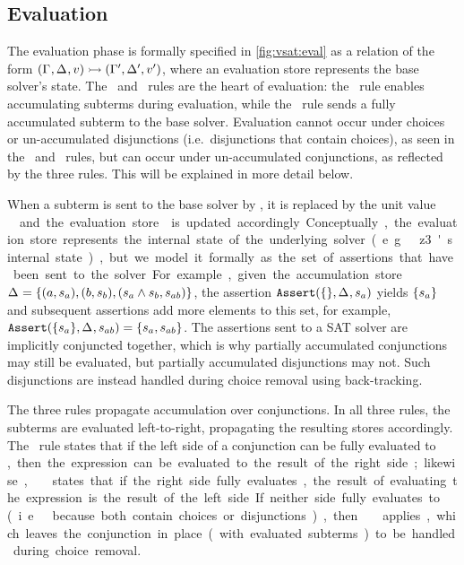 \subsection{Evaluation}
%
The evaluation phase is formally specified in \autoref{fig:vsat:eval} as a
relation of the form
$(\Gamma_{},\Delta_{},v)\rightarrowtail{}(\Gamma_{}',\Delta_{}',v')$, where an
evaluation store \eStore{} represents the base solver's state.
%
The \evAcc\ and \evSym\ rules are the heart of evaluation: the \evAcc\ rule
enables accumulating subterms during evaluation, while the \evSym\ rule sends a
fully accumulated subterm to the base solver. Evaluation cannot occur under
choices or un-accumulated disjunctions (i.e.\ disjunctions that contain
choices), as seen in the \evChc\ and \evOr\ rules, but can occur under
un-accumulated conjunctions, as reflected by the three  rules. This
will be explained in more detail below.


When a subterm is sent to the base solver by \evSym, it is replaced by the unit
value \unit\ and the evaluation store \eStore{} is updated accordingly.
%
Conceptually, the evaluation store represents the internal state of the
underlying solver (e.g.\ z3's internal state), but we model it formally as the
set of assertions that have been sent to the solver. For example, given the
accumulation store $\aStore{}=\set{(a,s_a),(b,s_b),(s_a \wedge s_b, s_{ab})}$,
the assertion $\passert(\set{},\aStore{},s_{a})$ yields $\set{s_a}$ and
subsequent assertions add more elements to this set, for example,
$\passert(\set{s_a},\aStore{},s_{ab})=\set{s_a,s_{ab}}$.
%
The assertions sent to a SAT solver are implicitly conjuncted together, which
is why partially accumulated conjunctions may still be evaluated, but partially
accumulated disjunctions may not. Such disjunctions are instead handled during
choice removal using back-tracking.


The three  rules propagate accumulation over conjunctions. In all
three rules, the subterms are evaluated left-to-right, propagating the
resulting stores accordingly.
%
The \evAndL\ rule states that if the left side of a conjunction can be fully
evaluated to \unit, then the expression can be evaluated to the result of the
right side; likewise, \evAndR\ states that if the right side fully evaluates,
the result of evaluating the expression is the result of the left side. If
neither side fully evaluates to \unit\ (i.e.\ because both contain choices or
disjunctions), then \evAnd\ applies, which leaves the conjunction in place
(with evaluated subterms) to be handled during choice removal.


